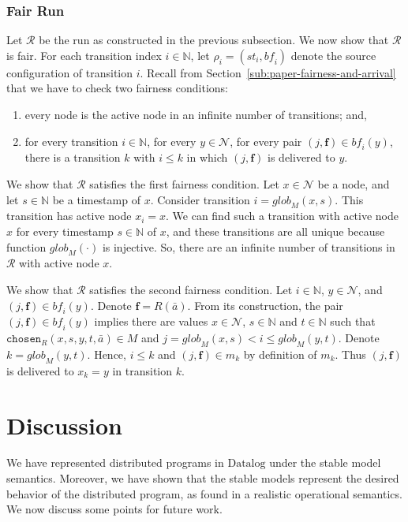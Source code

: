 \documentclass{tlp}
\newcommand{\langname}[1]{\text{#1}}  \newcommand{\pred}[1]{\mathtt{#1}}  \newcommand{\fname}[1]{\mathit{#1}}  \newcommand{\sq}[1]{`{#1}'}
\newcommand{\datalog}{\langname{Datalog}}
\newcommand{\Nat}{\mathbb{N}}  \newcommand{\len}[1]{|#1|} \newcommand{\rom}[1]{\text{\emph{(#1)}}} \newcommand{\romI}{\rom i}
\newcommand{\fc}{\boldsymbol{f}}
\newcommand{\nw}{\mathcal{N}}
\newcommand{\chosen}{\pred{chosen}}
\newcommand{\cnf}{\rho}
\newcommand{\cnfs}{\mathit{st}}
\newcommand{\cnfb}{\mathit{bf}}
\newcommand{\pair}[2]{(#1,#2)}
\newcommand{\run}{\mathcal{R}}
\newcommand{\globM}[1]{\fname{glob}_{M}(#1)}
\begin{document}
\subsubsection{Fair Run}

\label{sub:fair-run}

Let $\run$ be the run as constructed in the previous subsection.
We now show that $\run$ is fair. For each transition index $i\in\Nat$,
let $\cnf_{i}=(\cnfs_{i},\cnfb_{i})$ denote the source configuration
of transition $i$. Recall from Section~\ref{sub:paper-fairness-and-arrival}
that we have to check two fairness conditions:
\begin{enumerate}
\item every node is the active node in an infinite number of transitions;
and,
\item for every transition $i\in\Nat$, for every $y\in\nw$, for every
pair $\pair j{\fc}\in\cnfb_{i}(y)$, there is a transition $k$ with
$i\leq k$ in which $\pair j{\fc}$ is delivered to $y$.
\end{enumerate}
We show that $\run$ satisfies the first fairness condition. Let $x\in\nw$
be a node, and let $s\in\Nat$ be a timestamp of $x$. Consider transition
$i=\globM{x,s}$. This transition has active node $x_{i}=x$. We can
find such a transition with active node $x$ for every timestamp $s\in\Nat$
of $x$, and these transitions are all unique because function $\globM{\cdot}$
is injective. So, there are an infinite number of transitions in $\run$
with active node $x$.

We show that $\run$ satisfies the second fairness condition. Let
$i\in\Nat$, $y\in\nw$, and $\pair j{\fc}\in\cnfb_{i}(y)$. Denote
$\fc=R(\bar{a})$. From its construction, the pair $\pair j{\fc}\in\cnfb_{i}(y)$
implies there are values $x\in\nw$, $s\in\Nat$ and $t\in\Nat$ such
that $\chosen_{R}(x,s,y,t,\bar{a})\in M$ and $j=\globM{x,s}<i\leq\globM{y,t}$.
Denote $k=\globM{y,t}$.  Hence, $i\leq k$ and $\pair j{\fc}\in m_{k}$
by definition of $m_{k}$. Thus $\pair j{\fc}$ is delivered to $x_{k}=y$
in transition $k$.


\section{Discussion}

\label{sec:discussion}

We have represented distributed programs in $\datalog$ under the
stable model semantics. Moreover, we have shown that the stable models
represent the desired behavior of the distributed program, as found
in a realistic operational semantics. We now discuss some points for
future work. 
\end{document}
